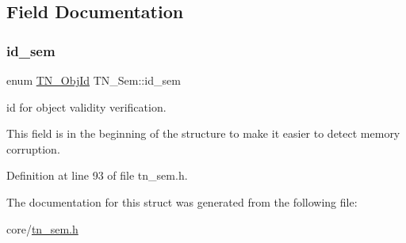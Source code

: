 \subsection{Field Documentation}
\mbox{\label{structTN__Sem_a810526e9b3d5595278ebb70e59a128e1}} 
\subsubsection{\texorpdfstring{id\+\_\+sem}{id\_sem}}
{\footnotesize\ttfamily enum \hyperlink{tn__common_8h_ae779dd1f6735f6e139fb70acd004d976}{T\+N\+\_\+\+Obj\+Id} T\+N\+\_\+\+Sem\+::id\+\_\+sem}



id for object validity verification. 

This field is in the beginning of the structure to make it easier to detect memory corruption. 

Definition at line 93 of file tn\+\_\+sem.\+h.



The documentation for this struct was generated from the following file\+:\begin{DoxyCompactItemize}
\item 
core/\hyperlink{tn__sem_8h}{tn\+\_\+sem.\+h}\end{DoxyCompactItemize}
